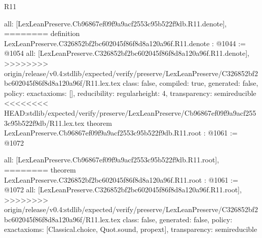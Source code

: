 \begin{lexlean}{R11}
\begin{coremodule}
{{{{{{{{{{{{  all: [LexLeanPreserve.Cb96867ef09f9a9acf2553c95b522f9db.R11.denote],
========
definition LexLeanPreserve.C326852bf2bc602045f86f8d8a120a96f.R11.denote : @1044 := @1054 {
  all: [LexLeanPreserve.C326852bf2bc602045f86f8d8a120a96f.R11.denote],
>>>>>>>> origin/release/v0.4:stdlib/expected/verify/preserve/LexLeanPreserve/C326852bf2bc602045f86f8d8a120a96f/R11.lex.tex
  class: false,
  compiled: true,
  generated: false,
  policy: exact{axioms: []},
  reducibility: regular{height: 4},
  transparency: semireducible
}
<<<<<<<< HEAD:stdlib/expected/verify/preserve/LexLeanPreserve/Cb96867ef09f9a9acf2553c95b522f9db/R11.lex.tex
theorem LexLeanPreserve.Cb96867ef09f9a9acf2553c95b522f9db.R11.root : @1061 := @1072 {
  all: [LexLeanPreserve.Cb96867ef09f9a9acf2553c95b522f9db.R11.root],
========
theorem LexLeanPreserve.C326852bf2bc602045f86f8d8a120a96f.R11.root : @1061 := @1072 {
  all: [LexLeanPreserve.C326852bf2bc602045f86f8d8a120a96f.R11.root],
>>>>>>>> origin/release/v0.4:stdlib/expected/verify/preserve/LexLeanPreserve/C326852bf2bc602045f86f8d8a120a96f/R11.lex.tex
  class: false,
  generated: false,
  policy: exact{axioms: [Classical.choice, Quot.sound, propext]},
  transparency: semireducible
}

}}}}}}}}}}}}}
\end{coremodule}
\end{lexlean}
